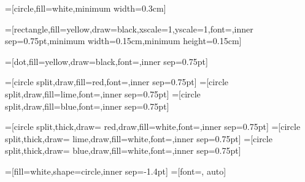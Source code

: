 =[circle,fill=white,minimum width=0.3cm]

=[rectangle,fill=yellow,draw=black,xscale=1,yscale=1,font=\small,inner sep=0.75pt,minimum width=0.15cm,minimum height=0.15cm]

=[dot,fill=yellow,draw=black,font=\tiny,inner sep=0.75pt]


=[circle split,draw,fill=red,font=\tiny,inner sep=0.75pt]
=[circle split,draw,fill=lime,font=\tiny,inner sep=0.75pt]
=[circle split,draw,fill=blue,font=\tiny,inner sep=0.75pt]

=[circle split,thick,draw= red,draw,fill=white,font=\tiny,inner sep=0.75pt]
=[circle split,thick,draw= lime,draw,fill=white,font=\tiny,inner sep=0.75pt]
=[circle split,thick,draw= blue,draw,fill=white,font=\tiny,inner sep=0.75pt]


=[fill=white,shape=circle,inner sep=-1.4pt]
=[font=\tiny, auto]

